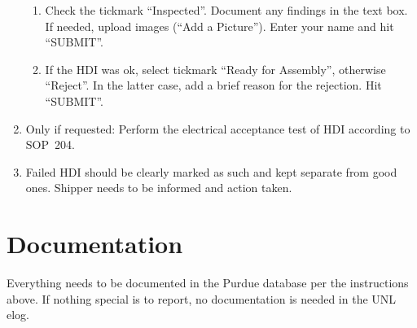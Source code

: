 \documentclass[12pt]{unlsilabsop}
\begin{document}
\begin{enumerate}
\begin{enumerate}
        \item Check the tickmark ``Inspected''. Document any findings in the text box. If needed, upload images (``Add a Picture''). Enter your name and hit ``SUBMIT''.
        \item If the HDI was ok, select tickmark ``Ready for Assembly'', otherwise ``Reject''. In the latter case, add a brief reason for the rejection. Hit ``SUBMIT''.
    \end{enumerate}
    \item Only if requested: Perform the electrical acceptance test of HDI according to SOP~204.
    \item Failed HDI should be clearly marked as such and kept separate from good ones. Shipper needs to be informed and action taken.
\end{enumerate}

\section{Documentation}
Everything needs to be documented in the Purdue database per the instructions above. If nothing special is to report, no documentation is needed in the UNL elog.
\end{document}

